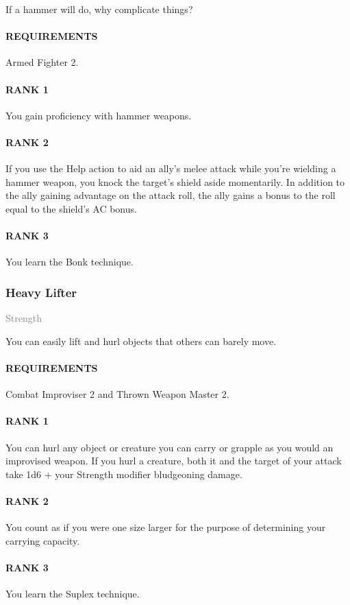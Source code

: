 \normalsize
If a hammer will do, why complicate things?
\paragraph{REQUIREMENTS} Armed Fighter 2.
\paragraph{RANK 1} You gain proficiency with hammer weapons.
\paragraph{RANK 2} If you use the Help action to aid an ally's melee attack while you're wielding a hammer weapon, you knock the target's shield aside momentarily.
In addition to the ally gaining advantage on the attack roll, the ally gains a bonus to the roll equal to the shield's AC bonus.
\paragraph{RANK 3} You learn the Bonk technique.

\subsubsection{Heavy Lifter} \label{feat::heavylifter}
\small{\textcolor{gray}{Strength}}

\normalsize
You can easily lift and hurl objects that others can barely move.
\paragraph{REQUIREMENTS} Combat Improviser 2 and Thrown Weapon Master 2.
\paragraph{RANK 1} You can hurl any object or creature you can carry or grapple as you would an improvised weapon.
If you hurl a creature, both it and the target of your attack take 1d6 + your Strength modifier bludgeoning damage.
\paragraph{RANK 2} You count as if you were one size larger for the purpose of determining your carrying capacity.
\paragraph{RANK 3} You learn the Suplex technique.

